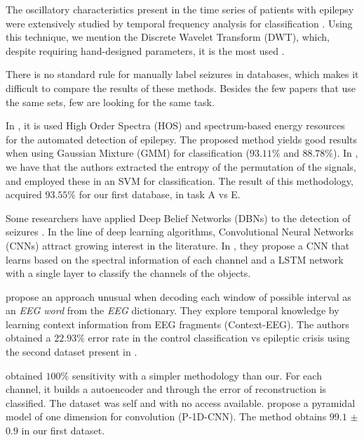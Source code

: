 The oscillatory characteristics present in the time series of patients with epilepsy were extensively studied by temporal frequency analysis for classification \cite{saab2005system,kuhlmann2009seizure,shoeb2004patient,shoeb2011machine}. Using this technique, we mention the Discrete Wavelet Transform (DWT), which, despite requiring hand-designed parameters, it is the most used \cite{ullah2018automated}.

There is no standard rule for manually label seizures in databases, which makes it difficult to compare the results of these methods. Besides the few papers that use the same sets, few are looking for the same task.

In \cite{chua2011application}, it is used High Order Spectra (HOS) and spectrum-based energy resources for the automated detection of epilepsy. The proposed method yields good results when using Gaussian Mixture (GMM) for classification ($93.11\%$ and $88.78\%$). In \cite{nicolaou2012detection}, we have that the authors extracted the entropy of the permutation of the signals, and employed these in an SVM for classification. The result of this methodology, acquired $93.55\%$ for our first database, in task A vs E.

Some researchers have applied Deep Belief Networks (DBNs) to the detection of seizures \cite{acharya2018deep}. In the line of deep learning algorithms, Convolutional Neural Networks (CNNs) attract growing interest in the literature. In \cite{hussein2018epileptic}, they propose a CNN that learns based on the spectral information of each channel and a LSTM network with a single layer to classify the channels of the objects. 

\cite{xun2016detecting} propose an approach unusual when decoding each window of possible interval as an {\it EEG word} from the {\it EEG} dictionary. They explore temporal knowledge by learning context information from EEG fragments (Context-EEG). The authors obtained a $22.93\%$ error rate in the control classification vs epileptic crisis using the second dataset present in \cite{WenZha:2018}. 

\cite{emami2019autoencoding}  obtained $100\%$ sensitivity with a simpler methodology than our. For each channel, it builds a autoencoder and through the error of reconstruction is classified. The dataset was self and with no access available. \cite{ullah2018automated} propose a pyramidal model of one dimension for convolution (P-1D-CNN). The method obtains $99.1$ $\pm$ $0.9$ in our first dataset.

